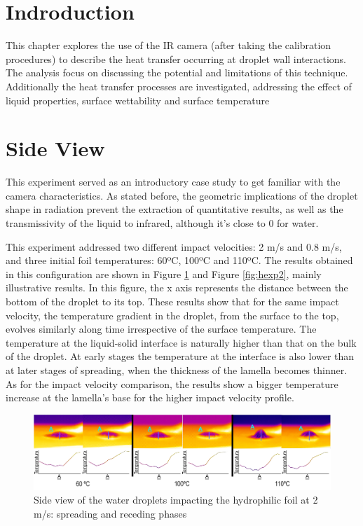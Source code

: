 \section{Indroduction}

\par This chapter explores the use of the IR camera (after taking the calibration procedures) to describe the heat transfer occurring at droplet wall interactions. The analysis focus on discussing the potential and limitations of this technique. Additionally the heat transfer processes are investigated, addressing the effect of liquid properties, surface wettability and surface temperature 

\section{Side View}

\par This experiment served as an introductory case study to get familiar with the camera characteristics. As stated before, the geometric implications of the droplet shape in radiation prevent the extraction of quantitative results, as well as the transmissivity of the liquid to infrared, although it's close to 0 for water.\\
\par This experiment addressed two different impact velocities: 2 m/s and 0.8 m/s, and three initial foil temperatures: 60ºC, 100ºC and 110ºC. The results obtained in this configuration are shown in Figure \ref{fig:hexp} and Figure \ref{fig:hexp2}, mainly illustrative results. In this figure, the x axis represents the distance between the bottom of the droplet to its top. These results show that for the same impact velocity, the temperature gradient in the droplet, from the surface to the top, evolves similarly along time irrespective of the surface temperature. The temperature at the liquid-solid interface is naturally higher than that on the bulk of the droplet. At early stages the temperature at the interface is also lower than at later stages of spreading, when the thickness of the lamella becomes thinner. As for the impact velocity comparison, the results show a bigger temperature increase at the lamella's base for the higher impact velocity profile.

\begin{figure}[h]
\includegraphics[width=1\linewidth]{Figures/5.Chapter/hexp.png}
\caption{Side view of the water droplets impacting the hydrophilic foil at 2 m/s: spreading and receding phases}
\label{fig:hexp}
\end{figure}

